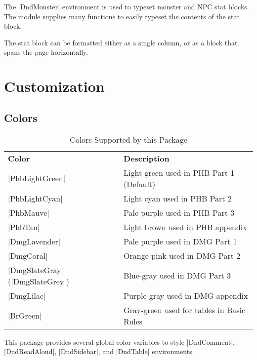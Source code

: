 \documentclass[letterpaper,twocolumn,openany,nodeprecatedcode]{dndbook}
\begin{document}
The |DndMonster| environment is used to typeset monster and NPC stat blocks. The module supplies many functions to easily typeset the contents of the stat block.

The stat block can be formatted either as a single column, or as a block that spans the page horizontally.

\part{Customization}

\chapter{Colors}

\begin{table*}[b]
  \caption{\DndFontTableTitle{}Colors Supported by this Package}\label{tab:colors}

  \begin{tabularx}{\linewidth}{lX}
    \textbf{Color}                  & \textbf{Description} \\
    \rowcolor{PhbLightGreen}
    |PhbLightGreen|                 & Light green used in PHB Part 1 (Default) \\
    \rowcolor{PhbLightCyan}
    |PhbLightCyan|                  & Light cyan used in PHB Part 2 \\
    \rowcolor{PhbMauve}
    |PhbMauve|                      & Pale purple used in PHB Part 3 \\
    \rowcolor{PhbTan}
    |PhbTan|                        & Light brown used in PHB appendix \\
    \rowcolor{DmgLavender}
    |DmgLavender|                   & Pale purple used in DMG Part 1 \\
    \rowcolor{DmgCoral}
    |DmgCoral|                      & Orange-pink used in DMG Part 2 \\
    \rowcolor{DmgSlateGray}
    |DmgSlateGray| (|DmgSlateGrey|) & Blue-gray used in DMG Part 3 \\
    \rowcolor{DmgLilac}
    |DmgLilac|                      & Purple-gray used in DMG appendix \\
    \rowcolor{BrGreen}
    |BrGreen|                       & Gray-green used for tables in Basic Rules\\
  \end{tabularx}
\end{table*}

This package provides several global color variables to style |DndComment|, |DndReadAloud|, |DndSidebar|, and |DndTable| environments.
\end{document}
